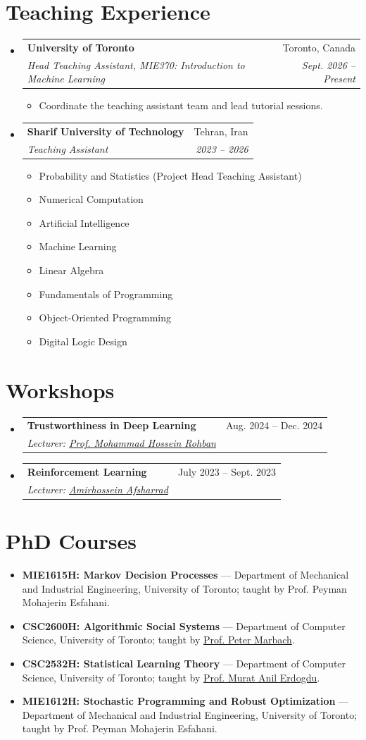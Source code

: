 \documentclass[letterpaper,11pt]{article}
\makeatletter
\newcommand{\resumeItem}[1]{
  \item\small{#1}
}
\newcommand{\resumeSubheading}[4]{
  \item
  \begin{tabular*}{\linewidth}[t]{l@{\extracolsep{\fill}}r}
    \textbf{#1} & #2 \\
    \textit{\small #3} & \textit{\small #4} \\
  \end{tabular*}\vspace{-4pt}
}
\newcommand{\resumeSubHeadingListStart}{\begin{itemize}[leftmargin=0.15in,label={},itemsep=6pt,parsep=0pt,topsep=4pt]}
\newcommand{\resumeSubHeadingListEnd}{\end{itemize}}
\newcommand{\resumeItemListStart}{\begin{itemize}[leftmargin=0.22in,itemsep=2pt,parsep=0pt,topsep=4pt]}
\newcommand{\resumeItemListEnd}{\end{itemize}\vspace{-2pt}}
\makeatother
\begin{document}
\section{Teaching Experience}
\resumeSubHeadingListStart
  \resumeSubheading
    {University of Toronto}{Toronto, Canada}
    {Head Teaching Assistant, MIE370: Introduction to Machine Learning}{Sept. 2026 -- Present}
    \resumeItemListStart
      \resumeItem{Coordinate the teaching assistant team and lead tutorial sessions.}
    \resumeItemListEnd

  \resumeSubheading
    {Sharif University of Technology}{Tehran, Iran}
    {Teaching Assistant}{2023 -- 2026}
    \resumeItemListStart
      \resumeItem{Probability and Statistics (Project Head Teaching Assistant)}
      \resumeItem{Numerical Computation}
      \resumeItem{Artificial Intelligence}
      \resumeItem{Machine Learning}
      \resumeItem{Linear Algebra}
      \resumeItem{Fundamentals of Programming}
      \resumeItem{Object-Oriented Programming}
      \resumeItem{Digital Logic Design}
    \resumeItemListEnd
\resumeSubHeadingListEnd

\section{Workshops}
\resumeSubHeadingListStart
  \resumeSubheading
    {Trustworthiness in Deep Learning}{Aug. 2024 -- Dec. 2024}
    {Lecturer: \href{https://sharif.edu/~rohban/}{Prof. Mohammad Hossein Rohban}}{}

  \resumeSubheading
    {Reinforcement Learning}{July 2023 -- Sept. 2023}
    {Lecturer: \href{https://profiles.stanford.edu/amirhossein-afsharrad}{Amirhossein Afsharrad}}{}
\resumeSubHeadingListEnd

\section{PhD Courses}
\resumeItemListStart
  \resumeItem{\textbf{MIE1615H: Markov Decision Processes} --- Department of Mechanical and Industrial Engineering, University of Toronto; taught by Prof. Peyman Mohajerin Esfahani.}
  \resumeItem{\textbf{CSC2600H: Algorithmic Social Systems} --- Department of Computer Science, University of Toronto; taught by \href{https://www.cs.toronto.edu/~marbach/}{Prof. Peter Marbach}.}
  \resumeItem{\textbf{CSC2532H: Statistical Learning Theory} --- Department of Computer Science, University of Toronto; taught by \href{https://www.cs.toronto.edu/~erdogdu/}{Prof. Murat Anil Erdogdu}.}
  \resumeItem{\textbf{MIE1612H: Stochastic Programming and Robust Optimization} --- Department of Mechanical and Industrial Engineering, University of Toronto; taught by Prof. Peyman Mohajerin Esfahani.}
\resumeItemListEnd
\end{document}
